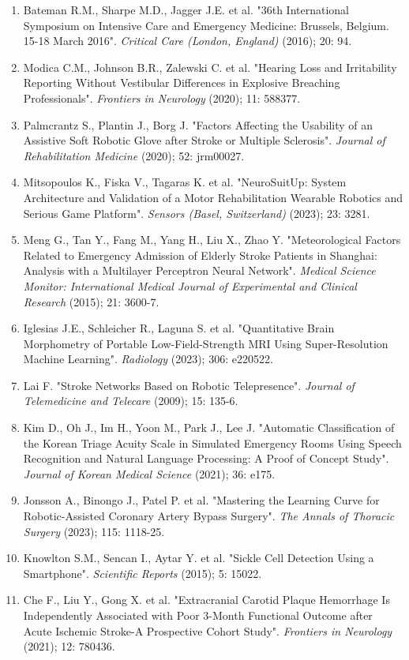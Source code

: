 {{\begin{enumerate}
    \item Bateman R.M., Sharpe M.D., Jagger J.E. et al. "36th International Symposium on Intensive Care and Emergency Medicine: Brussels, Belgium. 15-18 March 2016". \textit{Critical Care (London, England)} (2016); 20: 94.
    \item Modica C.M., Johnson B.R., Zalewski C. et al. "Hearing Loss and Irritability Reporting Without Vestibular Differences in Explosive Breaching Professionals". \textit{Frontiers in Neurology} (2020); 11: 588377.
    \item Palmcrantz S., Plantin J., Borg J. "Factors Affecting the Usability of an Assistive Soft Robotic Glove after Stroke or Multiple Sclerosis". \textit{Journal of Rehabilitation Medicine} (2020); 52: jrm00027.
    \item Mitsopoulos K., Fiska V., Tagaras K. et al. "NeuroSuitUp: System Architecture and Validation of a Motor Rehabilitation Wearable Robotics and Serious Game Platform". \textit{Sensors (Basel, Switzerland)} (2023); 23: 3281.
    \item Meng G., Tan Y., Fang M., Yang H., Liu X., Zhao Y. "Meteorological Factors Related to Emergency Admission of Elderly Stroke Patients in Shanghai: Analysis with a Multilayer Perceptron Neural Network". \textit{Medical Science Monitor: International Medical Journal of Experimental and Clinical Research} (2015); 21: 3600-7.
    \item Iglesias J.E., Schleicher R., Laguna S. et al. "Quantitative Brain Morphometry of Portable Low-Field-Strength MRI Using Super-Resolution Machine Learning". \textit{Radiology} (2023); 306: e220522.
    \item Lai F. "Stroke Networks Based on Robotic Telepresence". \textit{Journal of Telemedicine and Telecare} (2009); 15: 135-6.
    \item Kim D., Oh J., Im H., Yoon M., Park J., Lee J. "Automatic Classification of the Korean Triage Acuity Scale in Simulated Emergency Rooms Using Speech Recognition and Natural Language Processing: A Proof of Concept Study". \textit{Journal of Korean Medical Science} (2021); 36: e175.
    \item Jonsson A., Binongo J., Patel P. et al. "Mastering the Learning Curve for Robotic-Assisted Coronary Artery Bypass Surgery". \textit{The Annals of Thoracic Surgery} (2023); 115: 1118-25.
    \item Knowlton S.M., Sencan I., Aytar Y. et al. "Sickle Cell Detection Using a Smartphone". \textit{Scientific Reports} (2015); 5: 15022.
    \item Che F., Liu Y., Gong X. et al. "Extracranial Carotid Plaque Hemorrhage Is Independently Associated with Poor 3-Month Functional Outcome after Acute Ischemic Stroke-A Prospective Cohort Study". \textit{Frontiers in Neurology} (2021); 12: 780436.

\end{enumerate}}}
